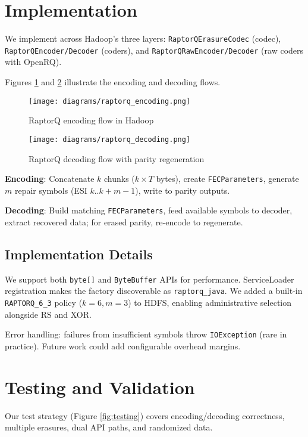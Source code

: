 \documentclass{article}
\begin{document}
\section{Implementation}

We implement across Hadoop's three layers: \texttt{RaptorQErasureCodec} (codec), \texttt{RaptorQEncoder/Decoder} (coders), and \texttt{RaptorQRawEncoder/Decoder} (raw coders with OpenRQ).

Figures \ref{fig:encoding} and \ref{fig:decoding} illustrate the encoding and decoding flows.

\begin{figure}[h]
\centering
\texttt{[image: diagrams/raptorq\_encoding.png]}
\caption{\label{fig:encoding}RaptorQ encoding flow in Hadoop}
\end{figure}

\begin{figure}[h]
\centering
\texttt{[image: diagrams/raptorq\_decoding.png]}
\caption{\label{fig:decoding}RaptorQ decoding flow with parity regeneration}
\end{figure}

\textbf{Encoding}: Concatenate $k$ chunks ($k \times T$ bytes), create \texttt{FECParameters}, generate $m$ repair symbols (ESI $k..k+m-1$), write to parity outputs.

\textbf{Decoding}: Build matching \texttt{FECParameters}, feed available symbols to decoder, extract recovered data; for erased parity, re-encode to regenerate.

\subsection{Implementation Details}

We support both \texttt{byte[]} and \texttt{ByteBuffer} APIs for performance. ServiceLoader registration makes the factory discoverable as \texttt{raptorq\_java}. We added a built-in \texttt{RAPTORQ\_6\_3} policy ($k=6, m=3$) to HDFS, enabling administrative selection alongside RS and XOR.

Error handling: failures from insufficient symbols throw \texttt{IOException} (rare in practice). Future work could add configurable overhead margins.

\section{Testing and Validation}

Our test strategy (Figure \ref{fig:testing}) covers encoding/decoding correctness, multiple erasures, dual API paths, and randomized data.
\end{document}
